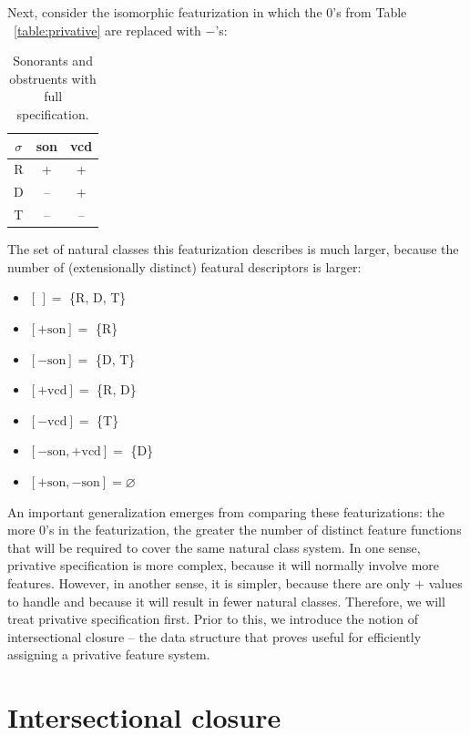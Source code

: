\documentclass[11pt, oneside]{article}   	%
\begin{document}
Next, consider the isomorphic featurization in which the $0$'s from Table ~\ref{table:privative} are replaced with $-$'s:

\begin{table}[h]
    \centering
    \begin{tabular} {|c||c|c|}
    \hline
        $\sigma$ & son & vcd \\ \hline
        R & + & + \\
        D & -- & + \\
        T & -- & -- \\
        \hline
    \end{tabular}
    \caption{Sonorants and obstruents with full specification.}
    \label{table:full}
\end{table}

\noindent The set of natural classes this featurization describes is much larger, because the number of (extensionally distinct) featural descriptors is larger: \begin{itemize}
    \item $[\,] =$ \{R, D, T\}
    \item $[+\text{son}] =$ \{R\}
    \item $[-\text{son}] =$ \{D, T\}
    \item $[+\text{vcd}] =$ \{R, D\}
    \item $[-\text{vcd}] =$ \{T\}
    \item $[-\text{son},+\text{vcd}] =$ \{D\}
    \item $[+\text{son},-\text{son}] = \varnothing$
    \end{itemize}

\noindent An important generalization emerges from comparing these featurizations: the more $0$'s in the featurization, the greater the number of distinct feature functions that will be required to cover the same natural class system. In one sense, privative specification is more complex, because it will normally involve more features. However, in another sense, it is simpler, because there are only $+$ values to handle and because it will result in fewer natural classes. Therefore, we will treat privative specification first. Prior to this, we introduce the notion of intersectional closure -- the data structure that proves useful for efficiently assigning a privative feature system.

\section{Intersectional closure}
\end{document}
